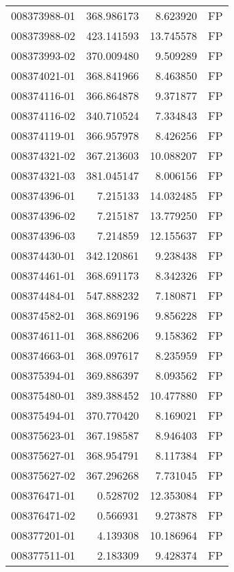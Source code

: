 \begin{tabular}{lrrl}
008373988-01 &  368.986173 &       8.623920 &   FP \\
008373988-02 &  423.141593 &      13.745578 &   FP \\
008373993-02 &  370.009480 &       9.509289 &   FP \\
008374021-01 &  368.841966 &       8.463850 &   FP \\
008374116-01 &  366.864878 &       9.371877 &   FP \\
008374116-02 &  340.710524 &       7.334843 &   FP \\
008374119-01 &  366.957978 &       8.426256 &   FP \\
008374321-02 &  367.213603 &      10.088207 &   FP \\
008374321-03 &  381.045147 &       8.006156 &   FP \\
008374396-01 &    7.215133 &      14.032485 &   FP \\
008374396-02 &    7.215187 &      13.779250 &   FP \\
008374396-03 &    7.214859 &      12.155637 &   FP \\
008374430-01 &  342.120861 &       9.238438 &   FP \\
008374461-01 &  368.691173 &       8.342326 &   FP \\
008374484-01 &  547.888232 &       7.180871 &   FP \\
008374582-01 &  368.869196 &       9.856228 &   FP \\
008374611-01 &  368.886206 &       9.158362 &   FP \\
008374663-01 &  368.097617 &       8.235959 &   FP \\
008375394-01 &  369.886397 &       8.093562 &   FP \\
008375480-01 &  389.388452 &      10.477880 &   FP \\
008375494-01 &  370.770420 &       8.169021 &   FP \\
008375623-01 &  367.198587 &       8.946403 &   FP \\
008375627-01 &  368.954791 &       8.117384 &   FP \\
008375627-02 &  367.296268 &       7.731045 &   FP \\
008376471-01 &    0.528702 &      12.353084 &   FP \\
008376471-02 &    0.566931 &       9.273878 &   FP \\
008377201-01 &    4.139308 &      10.186964 &   FP \\
008377511-01 &    2.183309 &       9.428374 &   FP \\

\end{tabular}
